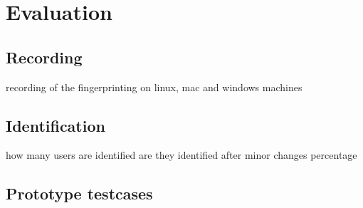 \chapter{Evaluation}
\label{cha:evaluation}


\section{Recording}
recording of the fingerprinting
on linux, mac and windows machines

\section{Identification}
how many users are identified
are they identified after minor changes
percentage

\section{Prototype testcases}

